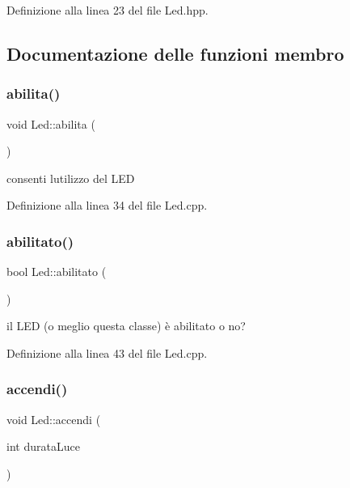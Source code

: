 Definizione alla linea 23 del file Led.\+hpp.



\subsection{Documentazione delle funzioni membro}
\mbox{\label{class_led_a7334b8983c471eb8ef81c5b6ac1a2f95}} 
\subsubsection{\texorpdfstring{abilita()}{abilita()}}
{\footnotesize\ttfamily void Led\+::abilita (\begin{DoxyParamCaption}{ }\end{DoxyParamCaption})}



consenti l\textquotesingle{}utilizzo del L\+ED 



Definizione alla linea 34 del file Led.\+cpp.

\mbox{\label{class_led_ababc80f90c068302fe021539f80ccc5f}} 
\subsubsection{\texorpdfstring{abilitato()}{abilitato()}}
{\footnotesize\ttfamily bool Led\+::abilitato (\begin{DoxyParamCaption}{ }\end{DoxyParamCaption})}



il L\+ED (o meglio questa classe) è abilitato o no? 



Definizione alla linea 43 del file Led.\+cpp.

\mbox{\label{class_led_a9fa1c8ec9236183ad84924b4a7f5649c}} 
\subsubsection{\texorpdfstring{accendi()}{accendi()}\hspace{0.1cm}{\footnotesize\ttfamily [1/2]}}
{\footnotesize\ttfamily void Led\+::accendi (\begin{DoxyParamCaption}\item[{int}]{durata\+Luce }\end{DoxyParamCaption})}



